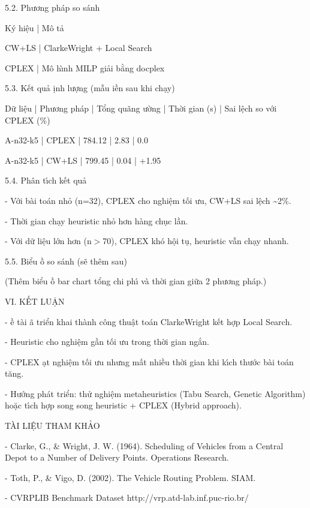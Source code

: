\documentclass[12pt]{article}
\begin{document}
5.2. Phương ph\'ap so s\'anh

K\'y hiệu | M\^o tả

CW+LS | Clarke{\textendash}Wright + Local Search

CPLEX | M\^o h{\`\i}nh MILP giải bằng docplex

5.3. Kết quả {\dj}ịnh lượng (mẫu {\dj}iền sau khi chạy)

Dữ liệu | Phương ph\'ap | Tổng qu\~ang {\dj}ường | Thời gian (s) | Sai lệch so với CPLEX (\%)

A-n32-k5 | CPLEX | 784.12 | 2.83 | 0.0

A-n32-k5 | CW+LS | 799.45 | 0.04 | +1.95

5.4. Ph\^an t{\'\i}ch kết quả

- Với b\`ai to\'an nhỏ (n=32), CPLEX cho nghiệm tối ưu, CW+LS sai lệch {\textasciitilde}2\%.

- Thời gian chạy heuristic nhỏ hơn h\`ang chục lần.

- Với dữ liệu lớn hơn (n\ensuremath{>}70), CPLEX kh\'o hội tụ, heuristic vẫn chạy nhanh.

5.5. Biểu {\dj}ồ so s\'anh (sẽ th\^em sau)

(Th\^em biểu {\dj}ồ bar chart tổng chi ph{\'\i} v\`a thời gian giữa 2 phương ph\'ap.)

VI. KẾT LUẬN

- {\DJ}ề t\`ai {\dj}\~a triển khai th\`anh c\^ong thuật to\'an Clarke{\textendash}Wright kết hợp Local Search.

- Heuristic cho nghiệm gần tối ưu trong thời gian ngắn.

- CPLEX {\dj}ạt nghiệm tối ưu nhưng mất nhiều thời gian khi k{\'\i}ch thước b\`ai to\'an t\u{a}ng.

- Hướng ph\'at triển: thử nghiệm metaheuristics (Tabu Search, Genetic Algorithm) hoặc t{\'\i}ch hợp song song heuristic + CPLEX (Hybrid approach).

T\`AI LIỆU THAM KHẢO

- Clarke, G., \& Wright, J. W. (1964). Scheduling of Vehicles from a Central Depot to a Number of Delivery Points. Operations Research.

- Toth, P., \& Vigo, D. (2002). The Vehicle Routing Problem. SIAM.

- CVRPLIB Benchmark Dataset {\textendash} http://vrp.atd-lab.inf.puc-rio.br/
\end{document}
